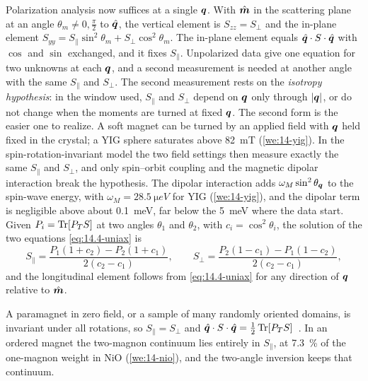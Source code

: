 Polarization analysis now suffices at a single $\bm{q}$. With $\hat{\bm{m}}$ in the scattering plane at an angle $\theta_m \ne 0, \frac\pi2$ to $\hat{\bm{q}}$, the vertical element is $S_{zz} = S_\perp$ and the in-plane element $S_{yy} = S_\parallel\sin^2\theta_m + S_\perp\cos^2\theta_m$. The in-plane element equals $\hat{\bm{q}}\cdot S\cdot\hat{\bm{q}}$ with $\cos$ and $\sin$ exchanged, and it fixes $S_\parallel$. Unpolarized data give one equation for two unknowns at each $\bm{q}$, and a second measurement is needed at another angle with the same $S_\parallel$ and $S_\perp$. The second measurement rests on the \emph{isotropy hypothesis}: in the window used, $S_\parallel$ and $S_\perp$ depend on $\bm{q}$ only through $|\bm{q}|$, or do not change when the moments are turned at fixed $\bm{q}$. The second form is the easier one to realize. A soft magnet can be turned by an applied field with $\bm{q}$ held fixed in the crystal; a YIG sphere saturates above \SI{82}{mT} (\cref{we:14-yig}). In the spin-rotation-invariant model the two field settings then measure exactly the same $S_\parallel$ and $S_\perp$, and only spin--orbit coupling and the magnetic dipolar interaction break the hypothesis. The dipolar interaction adds $\omega_M\sin^2\theta_{\bm{q}}$ to the spin-wave energy, with $\omega_M = \SI{28.5}{\micro eV}$ for YIG (\cref{we:14-yig}), and the dipolar term is negligible above about \SI{0.1}{meV}, far below the \SI{5}{meV} where the data start. Given $P_i = \operatorname{Tr}[P_TS]$ at two angles $\theta_1$ and $\theta_2$, with $c_i = \cos^2\theta_i$, the solution of the two equations \cref{eq:14.4-uniax} is
\begin{equation}
  S_\parallel = \frac{P_1(1 + c_2) - P_2(1 + c_1)}{2(c_2 - c_1)}, \qquad S_\perp = \frac{P_2(1 - c_1) - P_1(1 - c_2)}{2(c_2 - c_1)} ,
  \label{eq:14.4-invert}
\end{equation}
and the longitudinal element follows from \cref{eq:14.4-uniax} for any direction of $\bm{q}$ relative to $\hat{\bm{m}}$.

A paramagnet in zero field, or a sample of many randomly oriented domains, is invariant under all rotations, so $S_\parallel = S_\perp$ and $\hat{\bm{q}}\cdot S\cdot\hat{\bm{q}} = \frac12\operatorname{Tr}[P_TS]$~\cite[Eq.~(35)]{berlin2025determining}. In an ordered magnet the two-magnon continuum lies entirely in $S_\parallel$, at \SI{7.3}{\percent} of the one-magnon weight in NiO (\cref{we:14-nio}), and the two-angle inversion keeps that continuum.

